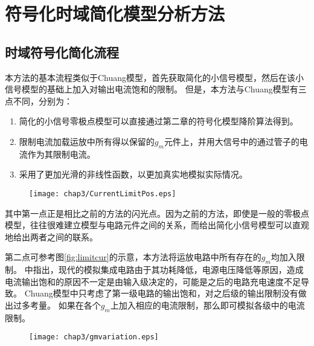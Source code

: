 \section{符号化时域简化模型分析方法}
\label{sec:time:simp}

\subsection{时域符号化简化流程}
\label{subsec:time:simp:process}

本方法的基本流程类似于Chuang模型，首先获取简化的小信号模型，然后在该小信号模型的基础上加入对输出电流饱和的限制。
但是，本方法与Chuang模型有三点不同，分别为：

\begin{enumerate}[label=\emph{\alph*})]
	\item 简化的小信号零极点模型可以直接通过第二章的符号化模型降阶算法得到。
	\item 限制电流加载运放中所有得以保留的$g_m$元件上，并用大信号中的通过管子的电流作为其限制电流。
	\item 采用了更加光滑的非线性函数，以更加真实地模拟实际情况。
\end{enumerate}

\begin{figure}[!htp]
	\centering
	\texttt{[image: chap3/CurrentLimitPos.eps]}
\end{figure}

其中第一点正是相比之前的方法的闪光点。因为之前的方法，即使是一般的零极点模型，往往很难建立模型与电路元件之间的关系，而给出简化小信号模型可以直观地给出两者之间的联系。

第二点可参考图\ref{fig:limitcur}的示意，本方法将运放电路中所有存在的$g_m$均加入限制。
\parencite{Yavari-TSSlew-2005}中指出，现代的模拟集成电路由于其功耗降低，电源电压降低等原因，造成电流输出饱和的原因不一定是由输入级决定的，可能是之后的电路充电速度不足导致。
Chuang模型中只考虑了第一级电路的输出饱和，对之后级的输出限制没有做出过多考量。
如果在各个$g_m$上加入相应的电流限制，那么即可模拟各级中的电流限制。

\begin{figure}[!htp]
	\centering
	\texttt{[image: chap3/gmvariation.eps]}
\end{figure}

